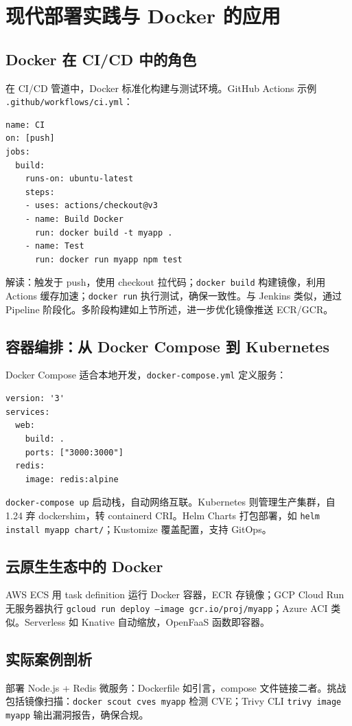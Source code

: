 \chapter{现代部署实践与 Docker 的应用}
\section{Docker 在 CI/CD 中的角色}
在 CI/CD 管道中，Docker 标准化构建与测试环境。GitHub Actions 示例 \texttt{.github/workflows/ci.yml}：\par
\begin{lstlisting}
name: CI
on: [push]
jobs:
  build:
    runs-on: ubuntu-latest
    steps:
    - uses: actions/checkout@v3
    - name: Build Docker
      run: docker build -t myapp .
    - name: Test
      run: docker run myapp npm test
\end{lstlisting}
解读：触发于 push，使用 checkout 拉代码；\texttt{docker build} 构建镜像，利用 Actions 缓存加速；\texttt{docker run} 执行测试，确保一致性。与 Jenkins 类似，通过 Pipeline 阶段化。多阶段构建如上节所述，进一步优化镜像推送 ECR/GCR。\par
\section{容器编排：从 Docker Compose 到 Kubernetes}
Docker Compose 适合本地开发，\texttt{docker-compose.yml} 定义服务：\par
\begin{lstlisting}
version: '3'
services:
  web:
    build: .
    ports: ["3000:3000"]
  redis:
    image: redis:alpine
\end{lstlisting}
\texttt{docker-compose up} 启动栈，自动网络互联。Kubernetes 则管理生产集群，自 1.24 弃 dockershim，转 containerd CRI。Helm Charts 打包部署，如 \texttt{helm install myapp chart/}；Kustomize 覆盖配置，支持 GitOps。\par
\section{云原生生态中的 Docker}
AWS ECS 用 task definition 运行 Docker 容器，ECR 存镜像；GCP Cloud Run 无服务器执行 \texttt{gcloud run deploy --image gcr.io/proj/myapp}；Azure ACI 类似。Serverless 如 Knative 自动缩放，OpenFaaS 函数即容器。\par
\section{实际案例剖析}
部署 Node.js + Redis 微服务：Dockerfile 如引言，compose 文件链接二者。挑战包括镜像扫描：\texttt{docker scout cves myapp} 检测 CVE；Trivy CLI \texttt{trivy image myapp} 输出漏洞报告，确保合规。\par
